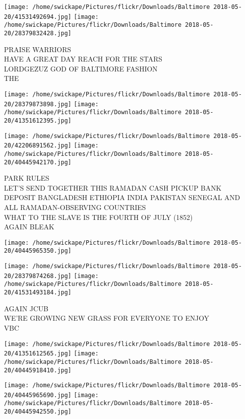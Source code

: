 \documentclass[10pt,letterpaper]{article}
\begin{document}
\texttt{[image: /home/swickape/Pictures/flickr/Downloads/Baltimore 2018-05-20/41531492694.jpg]}
\texttt{[image: /home/swickape/Pictures/flickr/Downloads/Baltimore 2018-05-20/28379832428.jpg]}

PRAISE WARRIORS\\
HAVE A GREAT DAY REACH FOR THE STARS\\
LORDGEZUZ GOD OF BALTIMORE FASHION\\
THE
\pagebreak

\texttt{[image: /home/swickape/Pictures/flickr/Downloads/Baltimore 2018-05-20/28379873898.jpg]}
\texttt{[image: /home/swickape/Pictures/flickr/Downloads/Baltimore 2018-05-20/41351612395.jpg]}

\texttt{[image: /home/swickape/Pictures/flickr/Downloads/Baltimore 2018-05-20/42206891562.jpg]}
\texttt{[image: /home/swickape/Pictures/flickr/Downloads/Baltimore 2018-05-20/40445942170.jpg]}

PARK RULES\\
LET'S SEND TOGETHER THIS RAMADAN CASH PICKUP BANK DEPOSIT BANGLADESH ETHIOPIA INDIA PAKISTAN SENEGAL AND ALL RAMADAN{-}OBSERVING COUNTRIES\\
WHAT TO THE SLAVE IS THE FOURTH OF JULY (1852)\\
AGAIN BLEAK
\pagebreak

\texttt{[image: /home/swickape/Pictures/flickr/Downloads/Baltimore 2018-05-20/40445965350.jpg]}

\vspace{0.25in}
\texttt{[image: /home/swickape/Pictures/flickr/Downloads/Baltimore 2018-05-20/28379874268.jpg]}
\texttt{[image: /home/swickape/Pictures/flickr/Downloads/Baltimore 2018-05-20/41531493184.jpg]}

AGAIN JCUB\\
WE'RE GROWING NEW GRASS FOR EVERYONE TO ENJOY\\
VBC
\pagebreak

\texttt{[image: /home/swickape/Pictures/flickr/Downloads/Baltimore 2018-05-20/41351612565.jpg]}
\texttt{[image: /home/swickape/Pictures/flickr/Downloads/Baltimore 2018-05-20/40445918410.jpg]}

\texttt{[image: /home/swickape/Pictures/flickr/Downloads/Baltimore 2018-05-20/40445965690.jpg]}
\texttt{[image: /home/swickape/Pictures/flickr/Downloads/Baltimore 2018-05-20/40445942550.jpg]}
\end{document}
